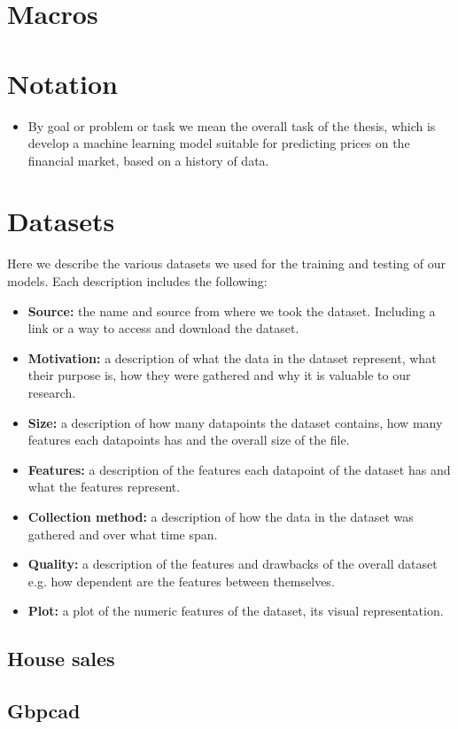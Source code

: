 \section{Macros}
\section{Notation}
\begin{itemize}
	\item By goal or problem or task we mean the overall task of the thesis, which is develop a machine learning model suitable for predicting prices on the financial market, based on a history of data.
\end{itemize}
\section{Datasets}
Here we describe the various datasets we used for the training and testing of our models. Each description includes the following:
\begin{itemize}
	\item \textbf{Source:} the name and source from where we took the dataset. Including a link or a way to access and download the dataset.
	\item \textbf{Motivation:} a description of what the data in the dataset represent, what their purpose is, how they were gathered and why it is valuable to our research.
	\item \textbf{Size:} a description of how many datapoints the dataset contains, how many features each datapoints has and the overall size of the file.
	\item \textbf{Features:} a description of the features each datapoint of the dataset has and what the features represent.
	\item \textbf{Collection method:} a description of how the data in the dataset was gathered and over what time span.
	\item \textbf{Quality:} a description of the features and drawbacks of the overall dataset e.g. how dependent are the features between themselves.
	\item \textbf{Plot:} a plot of the numeric features of the dataset, its visual representation.
\end{itemize}
\subsection{House sales}
\subsection{Gbpcad}
